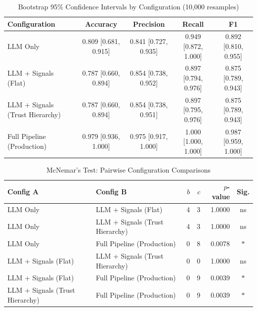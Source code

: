 \begin{table}[h]
\centering
\caption{Bootstrap 95\% Confidence Intervals by Configuration (10,000 resamples)}
\label{tab:e8_bootstrap_ci}
\begin{tabular}{l c c c c}
\hline
Configuration & Accuracy & Precision & Recall & F1 \\
\hline
LLM Only & 0.809 [0.681, 0.915] & 0.841 [0.727, 0.935] & 0.949 [0.872, 1.000] & 0.892 [0.810, 0.955] \\
LLM + Signals (Flat) & 0.787 [0.660, 0.894] & 0.854 [0.738, 0.952] & 0.897 [0.794, 0.976] & 0.875 [0.789, 0.943] \\
LLM + Signals (Trust Hierarchy) & 0.787 [0.660, 0.894] & 0.854 [0.738, 0.951] & 0.897 [0.795, 0.976] & 0.875 [0.789, 0.943] \\
Full Pipeline (Production) & 0.979 [0.936, 1.000] & 0.975 [0.917, 1.000] & 1.000 [1.000, 1.000] & 0.987 [0.959, 1.000] \\
\hline
\end{tabular}
\end{table}

\begin{table}[h]
\centering
\caption{McNemar's Test: Pairwise Configuration Comparisons}
\label{tab:e8_mcnemar}
\begin{tabular}{l l r r r c}
\hline
Config A & Config B & $b$ & $c$ & $p$-value & Sig. \\
\hline
LLM Only & LLM + Signals (Flat) & 4 & 3 & 1.0000 & ns \\
LLM Only & LLM + Signals (Trust Hierarchy) & 4 & 3 & 1.0000 & ns \\
LLM Only & Full Pipeline (Production) & 0 & 8 & 0.0078 & $\ast$ \\
LLM + Signals (Flat) & LLM + Signals (Trust Hierarchy) & 0 & 0 & 1.0000 & ns \\
LLM + Signals (Flat) & Full Pipeline (Production) & 0 & 9 & 0.0039 & $\ast$ \\
LLM + Signals (Trust Hierarchy) & Full Pipeline (Production) & 0 & 9 & 0.0039 & $\ast$ \\
\hline
\end{tabular}
\end{table}

